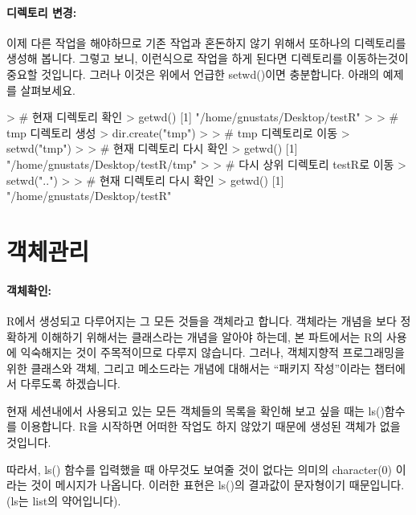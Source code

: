 \paragraph{디렉토리 변경:}
이제 다른 작업을 해야하므로 기존 작업과 혼돈하지 않기 위해서 또하나의 디렉토리를 생성해 봅니다. 
그렇고 보니, 이런식으로 작업을 하게 된다면 디렉토리를 이동하는것이 중요할 것입니다. 
그러나 이것은 위에서 언급한 setwd()이면 충분합니다. 
아래의 예제를 살펴보세요.

\begin{Schunk}
\begin{Soutput}
> # 현재 디렉토리 확인 
> getwd()
[1] "/home/gnustats/Desktop/testR"
> 
> # tmp 디렉토리 생성 
> dir.create("tmp")
>
> # tmp 디렉토리로 이동 
> setwd("tmp")
> 
> # 현재 디렉토리 다시 확인 
> getwd()
[1] "/home/gnustats/Desktop/testR/tmp"
> 
> # 다시 상위 디렉토리 testR로 이동 
> setwd("..")
>
> # 현재 디렉토리 다시 확인 
> getwd()
[1] "/home/gnustats/Desktop/testR"
\end{Soutput}
\end{Schunk}


\section{객체관리}

\paragraph{객체확인: } R에서 생성되고 다루어지는 그 모든 것들을 객체라고 합니다. 
객체라는 개념을 보다 정확하게 이해하기 위해서는 클래스라는 개념을 알아야 하는데, 본 파트에서는 R의 사용에 익숙해지는 것이 주목적이므로 다루지 않습니다.
그러나, 객체지향적 프로그래밍을 위한 클래스와 객체, 그리고 메소드라는 개념에 대해서는 ``패키지 작성''이라는 챕터에서 다루도록 하겠습니다. 

현재 세션내에서 사용되고 있는 모든 객체들의 목록을 확인해 보고 싶을 때는 ls()함수를 이용합니다. 
R을 시작하면 어떠한 작업도 하지 않았기 때문에 생성된 객체가 없을 것입니다. 

\begin{Schunk}
\end{Schunk}
따라서, ls() 함수를 입력했을 때 아무것도 보여줄 것이 없다는 의미의 character(0) 이라는 것이 메시지가 나옵니다.
이러한 표현은 ls()의 결과값이 문자형이기 때문입니다.
(ls는 list의 약어입니다).


